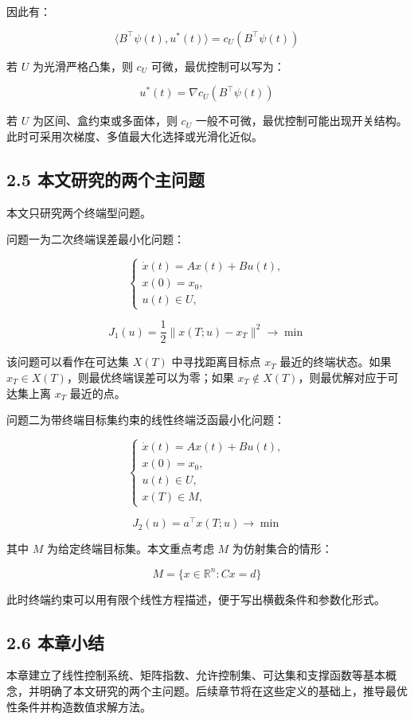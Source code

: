 \documentclass[UTF8,a4paper,zihao=-4]{ctexart}
\begin{document}
因此有：

\[
\langle B^\top\psi(t),u^*(t)\rangle=c_U(B^\top\psi(t))
\]

若 $U$ 为光滑严格凸集，则 $c_U$ 可微，最优控制可以写为：

\[
u^*(t)=\nabla c_U(B^\top\psi(t))
\]

若 $U$ 为区间、盒约束或多面体，则 $c_U$ 一般不可微，最优控制可能出现开关结构。
此时可采用次梯度、多值最大化选择或光滑化近似。


\subsection{2.5 本文研究的两个主问题}

本文只研究两个终端型问题。

问题一为二次终端误差最小化问题：

\[
\begin{cases}
\dot{x}(t)=Ax(t)+Bu(t),\\
x(0)=x_0,\\
u(t)\in U,
\end{cases}
\]

\[
J_1(u)=\frac{1}{2}\|x(T;u)-x_T\|^2\to\min
\]

该问题可以看作在可达集 $X(T)$ 中寻找距离目标点 $x_T$ 最近的终端状态。如果 $x_T\in X(T)$，则最优终端误差可以为零；如果 $x_T\notin X(T)$，则最优解对应于可达集上离 $x_T$ 最近的点。

问题二为带终端目标集约束的线性终端泛函最小化问题：

\[
\begin{cases}
\dot{x}(t)=Ax(t)+Bu(t),\\
x(0)=x_0,\\
u(t)\in U,\\
x(T)\in M,
\end{cases}
\]

\[
J_2(u)=a^\top x(T;u)\to\min
\]

其中 $M$ 为给定终端目标集。本文重点考虑 $M$ 为仿射集合的情形：

\[
M=\{x\in\mathbb{R}^n:Cx=d\}
\]

此时终端约束可以用有限个线性方程描述，便于写出横截条件和参数化形式。

\subsection{2.6 本章小结}

本章建立了线性控制系统、矩阵指数、允许控制集、可达集和支撑函数等基本概念，并明确了本文研究的两个主问题。后续章节将在这些定义的基础上，推导最优性条件并构造数值求解方法。
\end{document}
